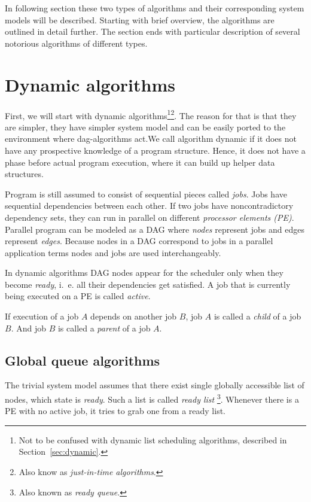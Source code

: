 In following section these two types of algorithms and their
corresponding system models will be described. Starting with brief
overview, the algorithms are outlined in detail further. The section
ends with particular description of several notorious algorithms of
different types.

\section{Dynamic algorithms}

First, we will start with dynamic algorithms\footnote{Not to be
  confused with dynamic list scheduling algorithms, described in
  Section~\ref{sec:dynamic}.}\footnote{Also know as \emph{just-in-time
    algorithms}.}. The reason for that is that they are simpler, they
have simpler system model and can be easily ported to the environment
where dag-algorithms act.We call algorithm dynamic if it does not have
any prospective knowledge of a program structure. Hence, it does not
have a phase before actual program execution, where it can build up
helper data structures.

Program is still assumed to consist of sequential pieces called
\emph{jobs}. Jobs have sequential dependencies between each other. If
two jobs have noncontradictory dependency sets, they can run in
parallel on different \emph{processor elements (PE)}.  Parallel
program can be modeled as a DAG where \emph{nodes} represent jobs and
edges represent \emph{edges}. Because nodes in a DAG correspond to
jobs in a parallel application terms nodes and jobs are used
interchangeably.

In dynamic algorithms DAG nodes appear for the scheduler only when
they become \emph{ready}, i.~e. all their dependencies get
satisfied. A job that is currently being executed on a PE is called
\emph{active}.

\begin{definition}
  If execution of a job $A$ depends on another job $B$, job $A$ is
  called a \emph{child} of a job $B$. And job $B$ is called a
  \emph{parent} of a job $A$.
\end{definition}

\subsection{Global queue algorithms}
\label{sec:global_queue}

The trivial system model assumes that there exist single globally
accessible list of nodes, which state is \emph{ready}. Such a list is
called \emph{ready list} \footnote{Also known as \emph{ready
    queue}.}. Whenever there is a PE with no active job, it tries to
grab one from a ready list.

